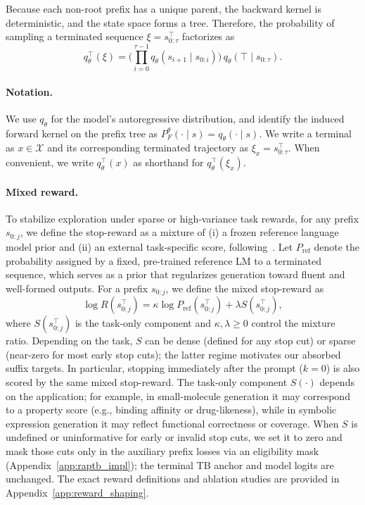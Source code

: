 \documentclass{article}
\theoremstyle{plain}
\theoremstyle{definition}
\theoremstyle{remark}
\begin{document}
Because each non-root prefix has a unique parent, the backward kernel is deterministic, and the state space forms a tree. Therefore, the probability of sampling a terminated sequence $\xi = s_{0:\tau}^{\top}$ factorizes as
\[
q_\theta^{\top}(\xi)
=
\Big(\prod_{i=0}^{\tau-1} q_\theta(s_{i+1}\mid s_{0:i})\Big)\,
q_\theta(\top\mid s_{0:\tau}).
\]

\paragraph{Notation.}
We use $q_\theta$ for the model's autoregressive distribution, and identify the induced forward kernel on the prefix tree as $P_F^\theta(\cdot\mid s)=q_\theta(\cdot\mid s)$.
We write a terminal as $x\in\mathcal{X}$ and its corresponding terminated trajectory as $\xi_x=s_{0:\tau}^{\top}$.
When convenient, we write $q_\theta^{\top}(x)$ as shorthand for $q_\theta^{\top}(\xi_x)$.


\paragraph{Mixed reward.}
To stabilize exploration under sparse or high-variance task rewards, for any prefix $s_{0:j}$, we define the stop-reward as a mixture of
(i) a frozen reference language model prior and
(ii) an external task-specific score, following~\citet{hu2024amortizing}.
Let $P_{\mathrm{ref}}$ denote the probability assigned by a fixed, pre-trained reference LM to a terminated sequence, which serves as a prior that regularizes generation toward fluent and well-formed outputs.
For a prefix $s_{0:j}$, we define the mixed stop-reward as
\[
\log R(s_{0:j}^{\top})
=
\kappa \log P_{\mathrm{ref}}(s_{0:j}^{\top})
+
\lambda S(s_{0:j}^{\top}),
\]
where $S(s_{0:j}^{\top})$ is the task-only component and $\kappa,\lambda \ge 0$ control the mixture ratio. Depending on the task, $S$ can be dense (defined for any stop cut) or sparse (near-zero for most early stop cuts); the latter regime motivates our absorbed suffix targets.
In particular, stopping immediately after the prompt ($k=0$) is also scored by the same mixed stop-reward.
The task-only component $S(\cdot)$ depends on the application; for example, in small-molecule generation it may correspond to a property score (e.g., binding affinity or drug-likeness), while in symbolic expression generation it may reflect functional correctness or coverage.
When $S$ is undefined or uninformative for early or invalid stop cuts, we set it to zero and mask those cuts only in the auxiliary prefix losses via an eligibility mask (Appendix~\ref{app:raptb_impl}); the terminal TB anchor and model logits are unchanged.
The exact reward definitions and ablation studies are provided in Appendix~\ref{app:reward_shaping}.
\end{document}
